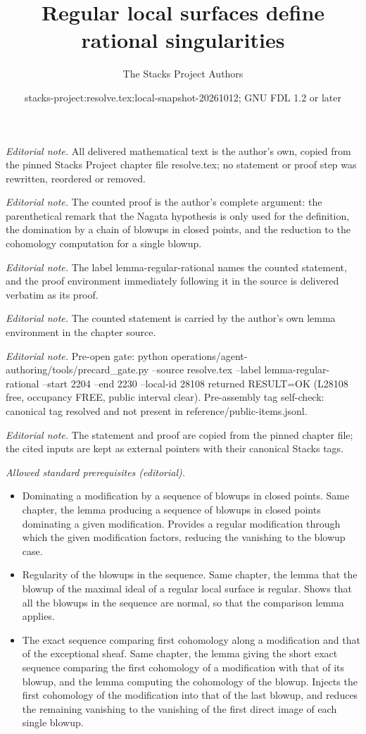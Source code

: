 \documentclass[10pt,a4paper]{amsart}
\title{Regular local surfaces define rational singularities}
\author{The Stacks Project Authors}
\date{stacks-project:resolve.tex:local-snapshot-20261012; GNU FDL 1.2 or later}
\theoremstyle{plain}
\theoremstyle{definition}
\theoremstyle{remark}
\numberwithin{equation}{subsection}
\begin{document}
\maketitle
\noindent\textit{Editorial note.} All delivered mathematical text is the author's own, copied from the pinned Stacks Project chapter file resolve.tex; no statement or proof step was rewritten, reordered or removed.\par\medskip
\noindent\textit{Editorial note.} The counted proof is the author's complete argument: the parenthetical remark that the Nagata hypothesis is only used for the definition, the domination by a chain of blowups in closed points, and the reduction to the cohomology computation for a single blowup.\par\medskip
\noindent\textit{Editorial note.} The label lemma-regular-rational names the counted statement, and the proof environment immediately following it in the source is delivered verbatim as its proof.\par\medskip
\noindent\textit{Editorial note.} The counted statement is carried by the author's own lemma environment in the chapter source.\par\medskip
\noindent\textit{Editorial note.} Pre-open gate: python operations/agent-authoring/tools/precard\_gate.py --source resolve.tex --label lemma-regular-rational --start 2204 --end 2230 --local-id 28108 returned RESULT=OK (L28108 free, occupancy FREE, public interval clear). Pre-assembly tag self-check: canonical tag resolved and not present in reference/public-items.jsonl.\par\medskip
\noindent\textit{Editorial note.} The statement and proof are copied from the pinned chapter file; the cited inputs are kept as external pointers with their canonical Stacks tags.\par\medskip
\noindent\textit{Allowed standard prerequisites (editorial).}\begin{itemize}
\item Dominating a modification by a sequence of blowups in closed points. Same chapter, the lemma producing a sequence of blowups in closed points dominating a given modification. Provides a regular modification through which the given modification factors, reducing the vanishing to the blowup case.
\item Regularity of the blowups in the sequence. Same chapter, the lemma that the blowup of the maximal ideal of a regular local surface is regular. Shows that all the blowups in the sequence are normal, so that the comparison lemma applies.
\item The exact sequence comparing first cohomology along a modification and that of the exceptional sheaf. Same chapter, the lemma giving the short exact sequence comparing the first cohomology of a modification with that of its blowup, and the lemma computing the cohomology of the blowup. Injects the first cohomology of the modification into that of the last blowup, and reduces the remaining vanishing to the vanishing of the first direct image of each single blowup.
\end{itemize}\medskip
\end{document}
